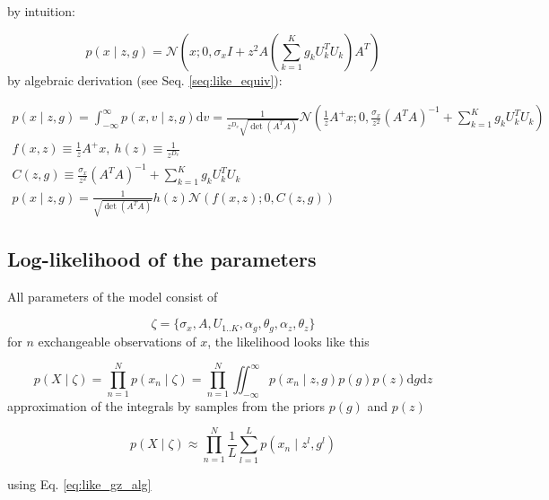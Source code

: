 \documentclass{paper}
\begin{document}
by intuition:

\begin{equation} \label{eq:like_gz_int}
p(x \mid z,g) = \mathcal{N}(x;0,\sigma_x I + z^2 A \left( \sum_{k=1}^K g_k U_k^T U_k \right)A^T)
\end{equation}
%
by algebraic derivation (see Seq. \ref{seq:like_equiv}):

\begin{eqnarray}
p(x \mid z,g) = \int_{-\infty}^{\infty} p(x,v \mid z,g)  \mathrm{d}v = \frac{1}{z^{D_v} \sqrt{\det(A^TA)}} \mathcal{N}(\frac{1}{z}A^{+}x;0,\frac{\sigma_x}{z^2} (A^TA)^{-1} + \sum_{k=1}^K g_k U_k^T U_k) \\
f(x,z) \equiv \frac{1}{z}A^{+}x, ~ h(z) \equiv  \frac{1}{z^{D_v} } \\
C(z,g) \equiv \frac{\sigma_x}{z^2} (A^TA)^{-1} + \sum_{k=1}^K g_k U_k^T U_k \\
p(x \mid z,g) = \frac{1}{\sqrt{\det(A^TA)}} h(z) \mathcal{N}(f(x,z);0,C(z,g)) \label{eq:like_gz_alg}
\end{eqnarray}

\subsection{Log-likelihood of the parameters}

All parameters of the model consist of

\begin{equation}
\zeta = \lbrace \sigma_x, A, U_{1..K}, \alpha_g, \theta_g, \alpha_z, \theta_z \rbrace
\end{equation}
%
for $n$ exchangeable observations of $x$, the likelihood looks like this

\begin{equation}
p(X \mid \zeta) = \prod_{n=1}^N p(x_n \mid \zeta) = \prod_{n=1}^N \iint_{-\infty}^{\infty} p(x_n \mid z,g) p(g) p(z) \mathrm{d}g\mathrm{d}z
\end{equation}
%
approximation of the integrals by samples from the priors $p(g)$ and $p(z)$

\begin{equation}
p(X \mid \zeta) \approx \prod_{n=1}^N \frac{1}{L} \sum_{l=1}^{L}p(x_n \mid z^l,g^l)
\end{equation}

using Eq. \ref{eq:like_gz_alg}
\end{document}
